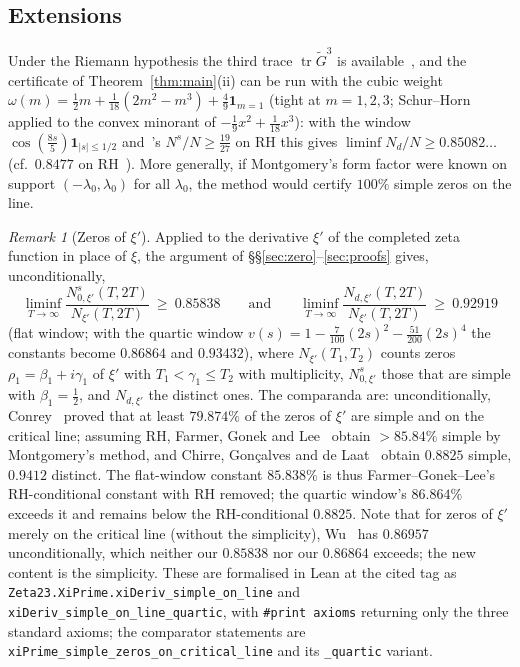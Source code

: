 \documentclass[11pt]{amsart}
\theoremstyle{definition}
\theoremstyle{remark}
\newtheorem{remark}[theorem]{Remark}
\numberwithin{equation}{section}
\DeclareMathOperator{\tr}{tr}
\newcommand{\Gt}{\widetilde{G}}
\newcommand{\one}{\mathbf 1}
\begin{document}
\subsection{Extensions}\label{subsec:cond}
Under the Riemann hypothesis the third trace $\tr\Gt^3$ is available~\cite{Hej94,RS96}, and the certificate of Theorem~\ref{thm:main}(ii) can be run with the cubic weight $\omega(m)=\tfrac12m+\tfrac1{18}(2m^2-m^3)+\tfrac49\one_{m=1}$ (tight at $m=1,2,3$; Schur--Horn applied to the convex minorant of $-\tfrac19x^2+\tfrac1{18}x^3$): with the window $\cos(\tfrac{8s}5)\one_{|s|\le1/2}$ and~\cite{BHB13}'s $N^s/N\ge\tfrac{19}{27}$ on RH this gives $\liminf N_d/N\ge0.85082\ldots$ (cf.\ $0.8477$ on RH~\cite{CGdL20}). More generally, if Montgomery's form factor were known on support $(-\lambda_0,\lambda_0)$ for all $\lambda_0$, the method would certify $100\%$ simple zeros on the line.

\begin{remark}[Zeros of $\xi'$]\label{rem:xiprime}
Applied to the derivative $\xi'$ of the completed zeta function in place of $\xi$, the argument of \S\S\ref{sec:zero}--\ref{sec:proofs} gives, unconditionally,
\[
\liminf_{T\to\infty}\frac{N^{s}_{0,\xi'}(T,2T)}{N_{\xi'}(T,2T)}\ \ge\ 0.85838\qquad\text{and}\qquad
\liminf_{T\to\infty}\frac{N_{d,\xi'}(T,2T)}{N_{\xi'}(T,2T)}\ \ge\ 0.92919
\]
(flat window; with the quartic window $v(s)=1-\tfrac{7}{100}(2s)^2-\tfrac{51}{200}(2s)^4$ the constants become $0.86864$ and $0.93432$), where $N_{\xi'}(T_1,T_2)$ counts zeros $\rho_1=\beta_1+i\gamma_1$ of $\xi'$ with $T_1<\gamma_1\le T_2$ with multiplicity, $N^{s}_{0,\xi'}$ those that are simple with $\beta_1=\tfrac12$, and $N_{d,\xi'}$ the distinct ones. The comparanda are: unconditionally, Conrey~\cite{Con89} proved that at least $79.874\%$ of the zeros of $\xi'$ are simple and on the critical line; assuming RH, Farmer, Gonek and Lee~\cite[Cor.~1.3]{FGL14} obtain $>85.84\%$ simple by Montgomery's method, and Chirre, Gon\c{c}alves and de Laat~\cite[Cor.~7]{CGdL20} obtain $0.8825$ simple, $0.9412$ distinct. The flat-window constant $85.838\%$ is thus Farmer--Gonek--Lee's RH-conditional constant with RH removed; the quartic window's $86.864\%$ exceeds it and remains below the RH-conditional $0.8825$. Note that for zeros of $\xi'$ merely on the critical line (without the simplicity), Wu~\cite[\S3]{Wu15} has $0.86957$ unconditionally, which neither our $0.85838$ nor our $0.86864$ exceeds; the new content is the simplicity. These are formalised in Lean at the cited tag as \texttt{Zeta23.XiPrime.xiDeriv\_simple\_on\_line} and \texttt{xiDeriv\_simple\_on\_line\_quartic}, with \verb|#print axioms| returning only the three standard axioms; the comparator statements are \texttt{xiPrime\_simple\_zeros\_on\_critical\_line} and its \texttt{\_quartic} variant.
\end{remark}
\end{document}
